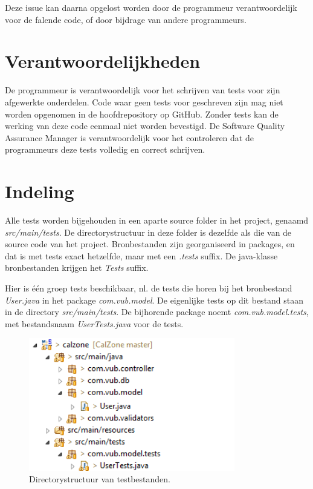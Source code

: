 Deze issue kan daarna opgelost worden door de programmeur verantwoordelijk voor de falende code, of door bijdrage van andere programmeurs.

\section{Verantwoordelijkheden}
De programmeur is verantwoordelijk voor het schrijven van tests voor zijn afgewerkte onderdelen. Code waar geen tests voor geschreven zijn mag niet worden opgenomen in de hoofdrepository op GitHub. Zonder tests kan de werking van deze code eenmaal niet worden bevestigd. De Software Quality Assurance Manager is verantwoordelijk voor het controleren dat de programmeurs deze tests volledig en correct schrijven.

\section{Indeling}
Alle tests worden bijgehouden in een aparte source folder in het project, genaamd \emph{src/main/tests}.
De directorystructuur in deze folder is dezelfde als die van de source code van het project.
Bronbestanden zijn georganiseerd in packages, en dat is met tests exact hetzelfde, maar met een \emph{.tests} suffix.
De java-klasse bronbestanden krijgen het \emph{Tests} suffix.

\noindent
Hier is één groep tests beschikbaar, nl. de tests die horen bij het bronbestand \emph{User.java} in het package \emph{com.vub.model}. 
De eigenlijke tests op dit bestand staan in de directory \emph{src/main/tests}. 
De bijhorende package noemt \emph{com.vub.model.tests}, met bestandsnaam \emph{UserTests.java} voor de tests.

\begin{figure}[ht!]
\centering
\includegraphics[width=90mm]{img/dir.png}
\caption{Directorystructuur van testbestanden.}
\label{dirstruct}
\end{figure}


